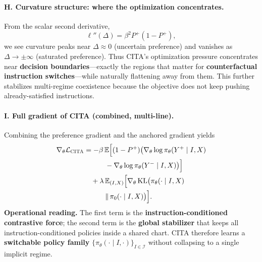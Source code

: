 \vspace{-0.35em}
\paragraph{\textbf{H. Curvature structure: where the optimization concentrates.}}
From the scalar second derivative,
\[
\ell''(\Delta)=\beta^2P^+(1-P^+),
\]
we see curvature peaks near $\Delta\approx 0$ (uncertain preference) and vanishes as $\Delta\to\pm\infty$ (saturated preference).
Thus CITA’s optimization pressure concentrates near \textbf{decision boundaries}---exactly the regions that matter for \textbf{counterfactual instruction switches}---while naturally flattening away from them.
This further stabilizes multi-regime coexistence because the objective does not keep pushing already-satisfied instructions.

\vspace{-0.35em}
\paragraph{\textbf{I. Full gradient of CITA (combined, multi-line).}}
Combining the preference gradient and the anchored gradient yields
{\small
\begin{align*}
\nabla_\theta \mathcal{L}_{\textsc{CITA}}
&= -\beta\,\mathbb{E}\Big[(1-P^+)\big(\nabla_\theta\log\pi_\theta(Y^+\mid I,X) \\
&\qquad\quad -\nabla_\theta\log\pi_\theta(Y^-\mid I,X)\big)\Big] \\
&\quad +\lambda\,\mathbb{E}_{(I,X)}\Big[\nabla_\theta\,\mathrm{KL}\big(\pi_\theta(\cdot\mid I,X)\\
&\qquad\quad \|\,\pi_0(\cdot\mid I,X)\big)\Big].
\end{align*}
}
\textbf{Operational reading.} The first term is the \textbf{instruction-conditioned contrastive force}; the second term is the \textbf{global stabilizer} that keeps all instruction-conditioned policies inside a shared chart.
CITA therefore learns a \textbf{switchable policy family} $\{\pi_\theta(\cdot\mid I,\cdot)\}_{I\in\mathcal{I}}$ without collapsing to a single implicit regime.

\vspace{-0.35em}
